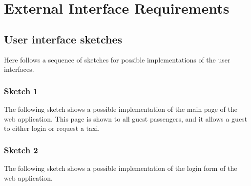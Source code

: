 \section{External Interface Requirements}
\subsection{User interface sketches}
Here follows a sequence of sketches for possible implementations of the user interfaces.


\subsubsection*{Sketch 1}
The following sketch shows a possible implementation of the main page of the web application. This page is shown to all guest passengers, and it allows a guest to either login or request a taxi.
\begin{figure}[H]
\centering
{}
\end{figure}


\subsubsection*{Sketch 2}
The following sketch shows a possible implementation of the login form of the web application.
\begin{figure}[H]
\centering
{}
\end{figure}


